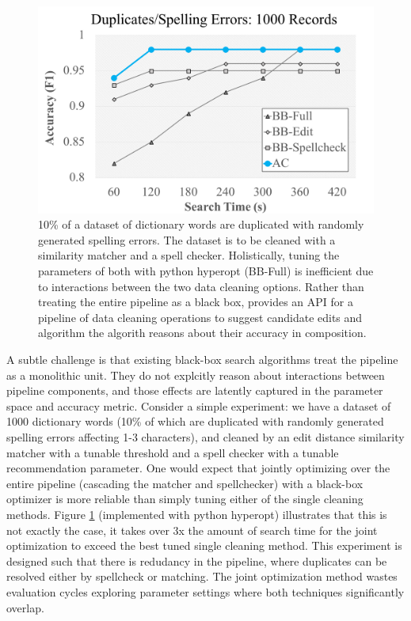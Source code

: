 \begin{figure}[t]
\centering
 \includegraphics[width=\columnwidth]{figures/teaser-experiment.png}
 \caption{\small 10\% of a dataset of dictionary words are duplicated with randomly generated spelling errors. The dataset is to be cleaned with a similarity matcher and a spell checker. Holistically, tuning the parameters of both with \textsf{python hyperopt} (BB-Full) is inefficient due to interactions between the two data cleaning options. Rather than treating the entire pipeline as a black box, \sys provides an API for a pipeline of data cleaning operations to suggest candidate edits and algorithm the algorith reasons about their accuracy in composition. \label{fig:teaser}}
\end{figure}

A subtle challenge is that existing black-box search algorithms treat the pipeline as a monolithic unit.
They do not explcitly reason about interactions between pipeline components, and those effects are latently captured in the parameter space and accuracy metric.
Consider a simple experiment: we have a dataset of 1000 dictionary words (10\% of which are duplicated with randomly generated spelling errors affecting 1-3 characters), and cleaned by an edit distance similarity matcher with a tunable threshold and a spell checker with a tunable recommendation parameter.
 One would expect that jointly optimizing over the entire pipeline (cascading the matcher and spellchecker) with a black-box optimizer is more reliable than simply tuning either of the single cleaning methods. 
Figure \ref{fig:teaser} (implemented with \textsf{python hyperopt}) illustrates that this is not exactly the case, it takes over 3x the amount of search time for the joint optimization to exceed the best tuned single cleaning method.
This experiment is designed such that there is redudancy in the pipeline, where duplicates can be resolved either by spellcheck or matching.
The joint optimization method wastes evaluation cycles exploring parameter settings where both techniques significantly overlap.



